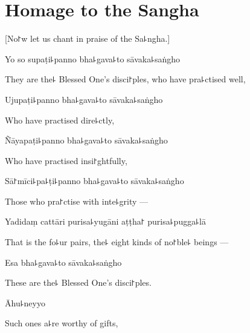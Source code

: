 \chapter{Homage to the Sangha}                      %

\begin{leader}
\end{leader}

\begin{english}
  [No꜓w let us chant in praise of the Sa꜕ngha.]
\end{english}

Yo so supaṭi꜕panno bha꜕gava꜕to sāvaka꜕saṅgho

\begin{english}
  They are the꜕ Blessed One's disci꜓ples, who have pra꜕ctised well,
\end{english}

Ujupaṭi꜕panno bha꜕gava꜕to sāvaka꜕saṅgho

\begin{english}
  Who have practised dire꜕ctly,
\end{english}

Ñāyapaṭi꜕panno bha꜕gava꜕to sāvaka꜕saṅgho

\begin{english}
  Who have practised insi꜓ghtfully,
\end{english}

Sā꜓mīci꜕pa꜕ṭi꜕panno bha꜕gava꜕to sāvaka꜕saṅgho

\begin{english}
  Those who pra꜓ctise with inte꜕grity ---
\end{english}

Yadidaṃ cattāri purisa꜕yugāni aṭṭha꜓ purisa꜕pugga꜕lā

\begin{english}
  That is the fo꜕ur pairs, the꜕ eight kinds of no꜓ble꜕ beings ---
\end{english}

Esa bha꜕gava꜕to sāvaka꜕saṅgho

\begin{english}
  These are the꜕ Blessed One's disci꜓ples.
\end{english}

Āhu꜕neyyo

\begin{english}
  Such ones a꜕re worthy of gifts,
\end{english}

